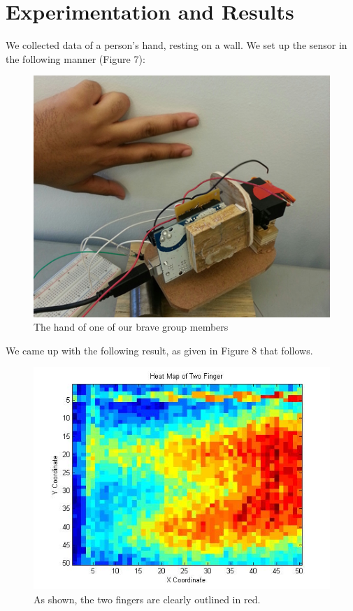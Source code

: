 \documentclass[11pt]{article}
\begin{document}
\section{Experimentation and Results}
We collected data of a person's hand, resting on a wall. We set up the sensor in the following manner (Figure 7):

\begin{figure}[H]
    \centering
    \includegraphics[width=.5\textwidth]{hand.jpg}
    \caption{The hand of one of our brave group members}
\end{figure}

\newpage
We came up with the following result, as given in Figure 8 that follows.

\begin{figure}[H]
    \centering
    \includegraphics[width=.6\textwidth]{TwoFingers}
    \caption{As shown, the two fingers are clearly outlined in red.}
\end{figure}
\end{document}
